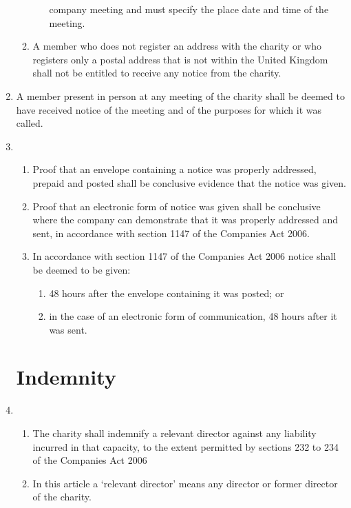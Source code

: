\documentclass{article}
\begin{document}
\begin{enumerate}[label=\arabic*, start=23]
\begin{enumerate}[label=(\arabic*)]
\begin{enumerate}[label=(\alph*)]
            company meeting and must specify the place date and
            time of the meeting.
        \end{enumerate}
        \item A member who does not register an address with the charity
        or who registers only a postal address that is not within the
        United Kingdom shall not be entitled to receive any notice from
        the charity.
    \end{enumerate}
    \item A member present in person at any meeting of the charity shall be
    deemed to have received notice of the meeting and of the purposes for
    which it was called.
    \item \begin{enumerate}[label=(\arabic*)]
        \item Proof that an envelope containing a notice was properly
        addressed, prepaid and posted shall be conclusive evidence that
        the notice was given.
        \item Proof that an electronic form of notice was given shall be
        conclusive where the company can demonstrate that it was
        properly addressed and sent, in accordance with section 1147 of
        the Companies Act 2006.
        \item In accordance with section 1147 of the Companies Act 2006
        notice shall be deemed to be given:
        \begin{enumerate}[label=(\alph*)]
            \item 48 hours after the envelope containing it was posted; or
            \item in the case of an electronic form of communication, 48
            hours after it was sent.
        \end{enumerate}
    \end{enumerate}
    
    \section{Indemnity}
    \item \begin{enumerate}[label=(\arabic*)]
        \item The charity shall indemnify a relevant director against any
        liability incurred in that capacity, to the extent permitted by
        sections 232 to 234 of the Companies Act 2006
        \item In this article a ‘relevant director’ means any director or former
        director of the charity.
    \end{enumerate}
    

\end{enumerate}
\end{document}
